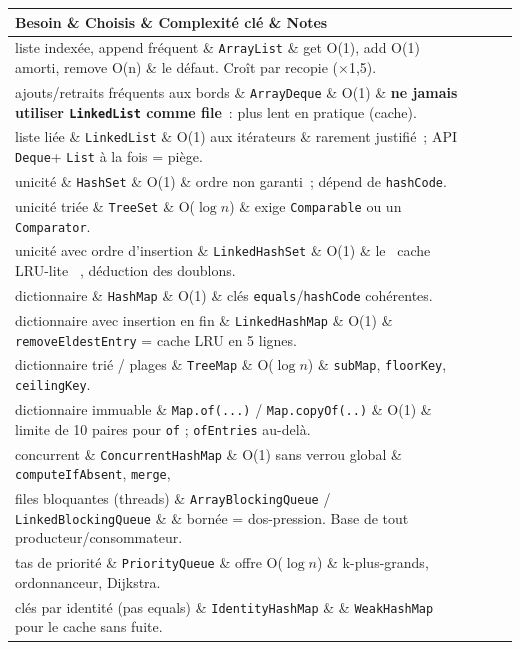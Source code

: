 \documentclass[12pt,a4paper,twoside,openright]{book}
\makeatletter
\newenvironment{tabz}[1]{\rowcolors{2}{white}{tralight}%
  \small\setlength{\tabcolsep}{5pt}\setlength{\LTpre}{3pt}\setlength{\LTpost}{3pt}%
  \begin{longtable}{@{}#1@{}}\toprule}
  {\bottomrule\end{longtable}\normalfont\setlength{\tabcolsep}{6pt}}
\newcommand{\thd}[1]{\textbf{\color{white}#1}}
\newcommand{\headrow}{\rowcolor{theadbg}}
\makeatother
\begin{document}
\begin{tabz}{lllX}
  \headrow \thd{Besoin} \& \thd{Choisis} \& \thd{Complexit\'e cl\'e} \& \thd{Notes} \\
  \midrule
  liste index\'ee, append fr\'equent \& \verb|ArrayList| \& get O(1), add O(1) amorti, remove O(n) \& le d\'efaut. Cro\^it par recopie ($\times$1{,}5). \\
  ajouts/retraits fr\'equents aux bords \& \verb|ArrayDeque| \& O(1) \& \textbf{ne jamais utiliser \verb|LinkedList| comme file}~: plus lent en pratique (cache). \\
  liste li\'ee \& \verb|LinkedList| \& O(1) aux it\'erateurs \& rarement justifi\'e~; API \verb|Deque|+ \verb|List| \`a la fois = pi\`ege. \\
  unicit\'e \& \verb|HashSet| \& O(1) \& ordre non garanti~; d\'epend de \verb|hashCode|. \\
  unicit\'e tri\'ee \& \verb|TreeSet| \& O($\log n$) \& exige \verb|Comparable| ou un \verb|Comparator|. \\
  unicit\'e avec ordre d'insertion \& \verb|LinkedHashSet| \& O(1) \& le \og ~cache LRU-lite~ \fg{}, d\'eduction des doublons. \\
  dictionnaire \& \verb|HashMap| \& O(1) \& cl\'es \verb|equals|/\verb|hashCode| coh\'erentes. \\
  dictionnaire avec insertion en fin \& \verb|LinkedHashMap| \& O(1) \& \verb|removeEldestEntry| = cache LRU en 5 lignes. \\
  dictionnaire tri\'e / plages \& \verb|TreeMap| \& O($\log n$) \& \verb|subMap|, \verb|floorKey|, \verb|ceilingKey|. \\
  dictionnaire immuable \& \verb|Map.of(...)| / \verb|Map.copyOf(..)| \& O(1) \& limite de 10 paires pour \verb|of| ; \verb|ofEntries| au-del\`a. \\
  concurrent \& \verb|ConcurrentHashMap| \& O(1) sans verrou global \& \verb|computeIfAbsent|, \verb|merge|, \verb|reduce*. \\
  files bloquantes (threads) \& \verb|ArrayBlockingQueue| / \verb|LinkedBlockingQueue| \& \& born\'ee = dos-pression. Base de tout producteur/consommateur. \\
  tas de priorit\'e \& \verb|PriorityQueue| \& offre O($\log n$) \& k-plus-grands, ordonnanceur, Dijkstra. \\
  cl\'es par identit\'e (pas equals) \& \verb|IdentityHashMap| \& \& \verb|WeakHashMap| pour le cache sans fuite. \\
\end{tabz}
\end{document}

